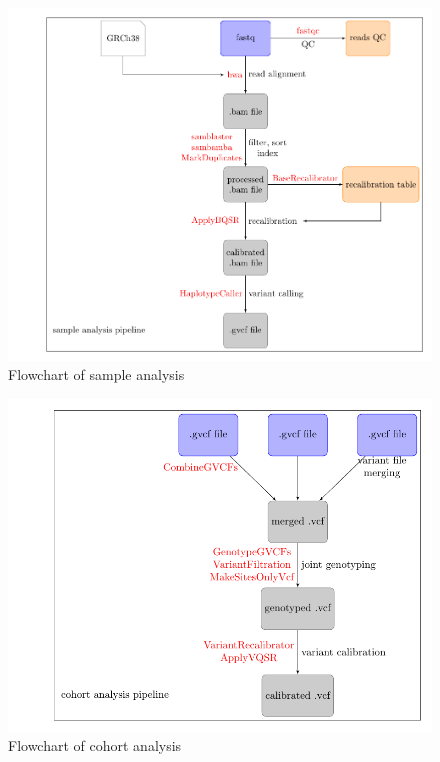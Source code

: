 \documentclass[a4paper]{article}
\begin{document}
\begin{figure}
  \begin{center}
    \includegraphics[scale=0.8]{fig-sample-analysis.pdf}
    \caption[sanple analysis]{Flowchart of sample analysis}
  \label{fig:sampleAnalysis}
\end{center}
\end{figure}


\begin{figure}
  \begin{center}
    \includegraphics[scale=0.8]{fig-cohort-analysis.pdf}
    \caption[cohort analysis]{Flowchart of cohort analysis}
  \label{fig:cohortAnalysis}
\end{center}
\end{figure}
\end{document}
